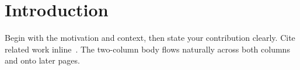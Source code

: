 \section{Introduction}
Begin with the motivation and context, then state your contribution
clearly. Cite related work inline~\cite{ref:shannon, ref:lecun}. The
two-column body flows naturally across both columns and onto later pages.
